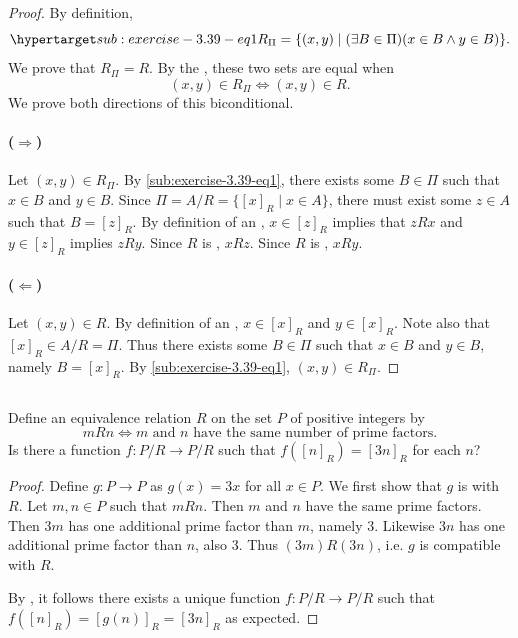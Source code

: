 \documentclass{report}
\begin{document}
  \begin{proof}
    By definition,
      \begin{equation}
        \hyperlabel{sub:exercise-3.39-eq1}
        R_\Pi = \{ (x, y) \mid (\exists B \in \Pi)(x \in B \land y \in B) \}.
      \end{equation}
    We prove that $R_\Pi = R$.
    By the , these two sets are equal when
      $$(x, y) \in R_\Pi \iff (x, y) \in R.$$
    We prove both directions of this biconditional.

    \paragraph{($\Rightarrow$)}%

      Let $(x, y) \in R_\Pi$.
      By \eqref{sub:exercise-3.39-eq1}, there exists some $B \in \Pi$ such that
        $x \in B$ and $y \in B$.
      Since $\Pi = A / R = \{[x]_R \mid x \in A\}$, there must exist some
        $z \in A$ such that $B = [z]_R$.
      By definition of an , $x \in [z]_R$ implies
        that $zRx$ and $y \in [z]_R$ implies $zRy$.
      Since $R$ is , $xRz$.
      Since $R$ is , $xRy$.

    \paragraph{($\Leftarrow$)}%

      Let $(x, y) \in R$.
      By definition of an , $x \in [x]_R$ and
        $y \in [x]_R$.
      Note also that $[x]_R \in A / R = \Pi$.
      Thus there exists some $B \in \Pi$ such that $x \in B$ and $y \in B$,
        namely $B = [x]_R$.
      By \eqref{sub:exercise-3.39-eq1}, $(x, y) \in R_\Pi$.
  \end{proof}

\subsection{}%

  Define an equivalence relation $R$ on the set $P$ of positive integers by
    $$mRn \iff m \text{ and } n \text{ have the same number of prime factors}.$$
  Is there a function $f \colon P / R \rightarrow P / R$ such that
    $f([n]_R) = [3n]_R$ for each $n$?

  \begin{proof}
    Define $g \colon P \rightarrow P$ as $g(x) = 3x$ for all $x \in P$.
    We first show that $g$ is  with $R$.
    Let $m, n \in P$ such that $mRn$.
    Then $m$ and $n$ have the same prime factors.
    Then $3m$ has one additional prime factor than $m$, namely $3$.
    Likewise $3n$ has one additional prime factor than $n$, also $3$.
    Thus $(3m)R(3n)$, i.e. $g$ is compatible with $R$.

    By , it follows there exists a unique function
      $f \colon P / R \rightarrow P / R$ such that
      $f([n]_R) = [g(n)]_R = [3n]_R$ as expected.
  \end{proof}
\end{document}
